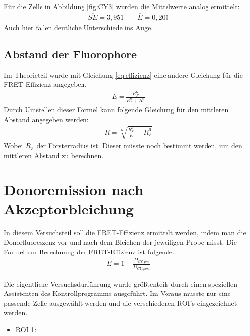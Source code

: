 Für die Zelle in Abbildung \ref{fig:CY3} wurden die Mittelwerte analog ermittelt: 
\begin{align*}
    \overline{SE} = 3,951 \qquad \overline{E} = 0,200
\end{align*}
Auch hier fallen deutliche Unterschiede ins Auge.

\subsection{Abstand der Fluorophore}
Im Theorieteil wurde mit Gleichung \ref{eq:effizienz} eine andere Gleichung für die FRET Effizienz angegeben. 
\begin{align}
    E = \frac{R_F^6}{R_F^6+R^6}
\end{align}
Durch Umstellen dieser Formel kann folgende Gleichung für den mittleren Abstand angegeben werden: 
\begin{align}
    R = \sqrt[6]{\frac{R_F^6}{E} - R_F^6} 
\end{align}
Wobei $R_F$ der Försterradius ist. Dieser müsste noch bestimmt werden, um den mittleren Abstand zu berechnen.

\newpage
\section{Donoremission nach Akzeptorbleichung}
In diesem Versuchsteil soll die FRET-Effizienz ermittelt werden, indem man die Donorfluoreszenz vor und nach dem Bleichen der jeweiligen Probe misst. Die Formel zur Berechnung der FRET-Effizienz ist folgende: 
\begin{align}
    E = 1 - \frac{D_{CY,pre}}{D_{CY,post}}
\end{align}

Die eigentliche Versuchsdurführung wurde größtenteils durch einen speziellen Assistenten des Kontrollprogramms ausgeführt. Im Voraus musste nur eine passende Zelle ausgewählt werden und die verschiedenen ROI's eingezeichnet werden.
\begin{itemize}
    \item ROI 1: 
\end{itemize}
